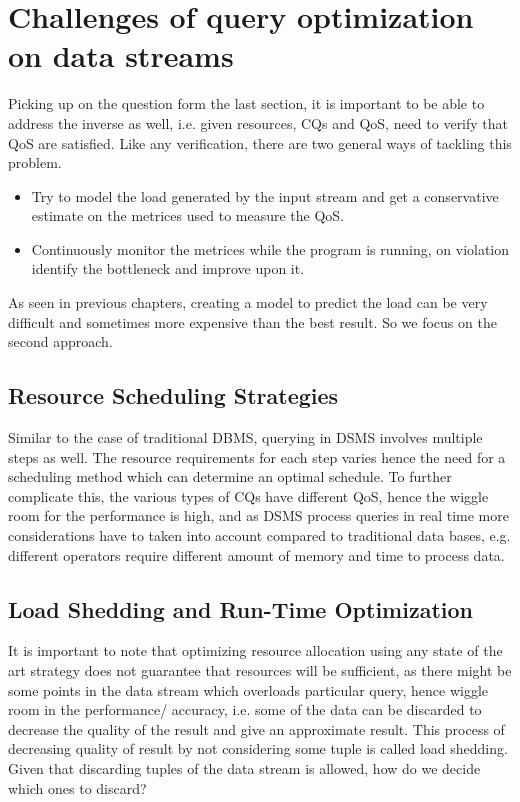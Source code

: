 \section{Challenges of query optimization on data streams}
Picking up on the question form the last section, it is important to be able to address the inverse as well, i.e. given resources, CQs and QoS, need to verify that QoS are satisfied. Like any verification, there are two general ways of tackling this problem.
\begin{itemize}
    \item Try to model the load generated by the input stream and get a conservative estimate on the metrices used to measure the QoS.
    \item Continuously monitor the metrices while the program is running, on violation identify the bottleneck and improve upon it.
\end{itemize}
As seen in previous chapters, creating a model to predict the load can be very difficult and sometimes more expensive than the best result. So we focus on the second approach.

\subsection{Resource Scheduling Strategies}
Similar to the case of traditional DBMS, querying in DSMS involves multiple steps as well. The resource requirements for each step varies hence the need for a scheduling method which can determine an optimal schedule. To further complicate this, the various types of CQs have different QoS, hence the wiggle room for the performance is high, and as DSMS process queries in real time more considerations have to taken into account compared to traditional data bases, e.g. different operators require different amount of memory and time to process data. 

\subsection{Load Shedding and Run-Time Optimization}
It is important to note that optimizing resource allocation using any state of the art strategy does not guarantee that resources will be sufficient, as there might be some points in the data stream which overloads particular query, hence wiggle room in the performance/ accuracy, i.e. some of the data can be discarded to decrease the quality of the result and give an approximate result. This process of decreasing quality of result by not considering some tuple is called load shedding. Given that discarding tuples of the data stream is allowed, how do we decide which ones to discard? 

